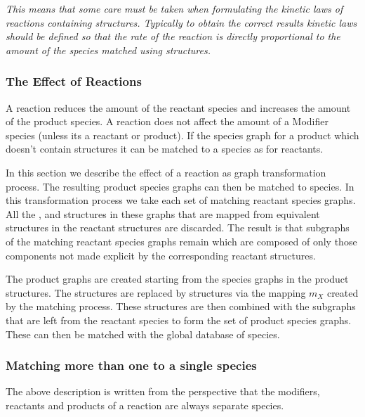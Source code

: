 \documentclass{cekarticle}
\begin{document}
\emph{This means that some care must be taken when formulating the kinetic laws of reactions containing
 structures.  Typically to obtain the correct results kinetic laws should be defined
so that the rate of the reaction is directly proportional to the amount of the species matched
using  structures.}

\subsubsection{The Effect of Reactions}
\label{sec:effect-of-reactions}

A reaction reduces the amount of the reactant species and increases the amount of the product
species.  A reaction does not affect the amount of a Modifier species (unless its a reactant or product).
If the species graph for a product which doesn't contain  structures it can be
matched to a species as for reactants.

In this section we describe the effect of a reaction as graph
transformation process. The resulting product species graphs can
then be matched to species. In this transformation process we take
each set of matching reactant species graphs. All the
,  and
 structures in these graphs that are mapped
from equivalent structures in the reactant
 structures are discarded. The result is
that subgraphs of the matching reactant species graphs remain
which are composed of only those components not made explicit by
the corresponding reactant  structures.

The product graphs are created starting from the species graphs in
the product  structures.  The
 structures are replaced by
 structures via the mapping $m_{X}$ created by
the matching process. These structures are then combined with the
subgraphs that are left from the reactant species to form the set
of product species graphs. These can then be matched with the
global database of species.

\subsubsection{Matching more than one  to a single species}

The above description is written from the perspective that the
modifiers, reactants and products of a reaction are always
separate species.
\end{document}

